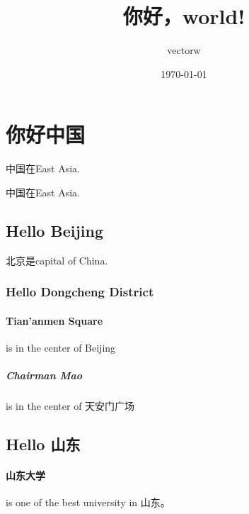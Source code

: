 \documentclass[UTF8]{ctexart}
\title{你好，world!}
\author{vectorw}
\date{\today}
\begin{document}
\tableofcontents
\maketitle

\section{你好中国}
中国在East Asia.

中国在East Asia.
\subsection{Hello Beijing}
北京是capital of China.
\subsubsection{Hello Dongcheng District}
\paragraph{Tian'anmen Square}
is in the center of Beijing
\subparagraph{Chairman Mao}
is in the center of 天安门广场
\subsection{Hello 山东}
\paragraph{山东大学} is one of the best university in 山东。
\end{document}

